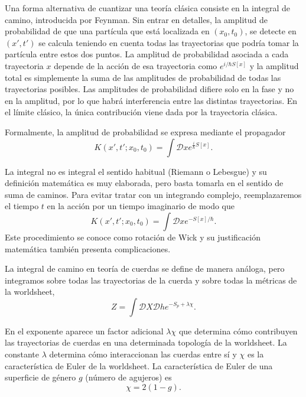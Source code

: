 Una forma alternativa de cuantizar una teoría clásica consiste en la integral de camino, 
introducida por Feynman. 
Sin entrar en detalles, la amplitud de probabilidad de que una partícula que está localizada 
en $(x_0,t_0)$, se detecte en $(x',t')$ se calcula teniendo en cuenta todas las trayectorias
que podría tomar la partícula entre estos dos puntos.
La amplitud de probabilidad asociada a cada trayectoria $x$ depende de la acción de esa trayectoria
como $e^{i/\hbar S[x]}$ y la amplitud total es simplemente la suma de las amplitudes de probabilidad
de todas las trayectorias posibles.
Las amplitudes de probabilidad difiere solo en la fase y no en la amplitud, por lo que habrá 
interferencia entre las distintas trayectorias.
En el límite clásico, la única contribución viene dada por la trayectoria clásica.

Formalmente, la amplitud de probabilidad se expresa mediante el propagador
\begin{equation}
  K(x',t';x_0,t_0) = \int \mathcal Dx e^{\frac{i}{\hbar} S[x]}.
\end{equation}

La integral no es integral el sentido habitual (Riemann o Lebesgue) y su definición matemática
es muy elaborada, pero basta tomarla en el sentido de suma de caminos.
Para evitar tratar con un integrando complejo, reemplazaremos el tiempo $t$ en la acción por un tiempo imaginario de modo que
\begin{equation}
  K(x',t';x_0,t_0) = \int \mathcal Dx e^{- S[x]/ \hbar}.
\end{equation}
Este procedimiento se conoce como rotación de Wick y su justificación matemática también presenta complicaciones.


La integral de camino en teoría de cuerdas se define de manera análoga, pero integramos 
sobre todas las trayectorias de la cuerda y sobre todas la métricas de la worldsheet,
\begin{equation}
  Z = \int \mathcal DX \mathcal Dh e^{-S_p+\lambda \chi}.
\end{equation}

En el exponente aparece un factor adicional $\lambda\chi$ que determina cómo contribuyen las trayectorias
de cuerdas en una determinada topología de la worldsheet.
La constante $\lambda$ determina cómo interaccionan las cuerdas entre sí y $\chi$ es la característica
de Euler de la worldsheet.
La característica de Euler de una superficie de género $g$ (número de agujeros) es
\begin{equation}
  \chi = 2(1-g).
\end{equation}

